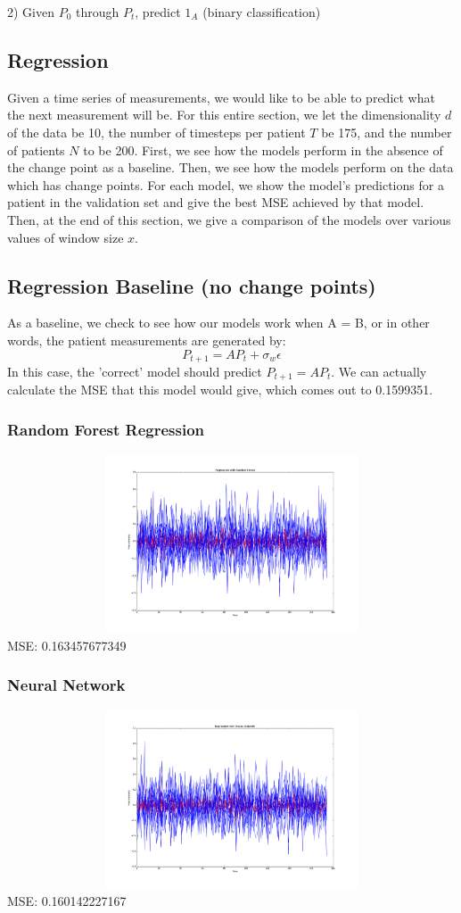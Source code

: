 \documentclass[12pt,a4paper]{article}
\begin{document}
2) Given $P_0$ through $P_t$, predict $1_A$ (binary classification) 

\subsection{Regression}
Given a time series of measurements, we would like to be able to predict what the next measurement will be.  For this entire section, we let the dimensionality $d$ of the data be 10, the number of timesteps per patient $T$ be 175, and the number of patients $N$ to be 200.   First, we see how the models perform in the absence of the change point as a baseline.  Then, we see how the models perform on the data which has change points. For each model, we show the model's predictions for a patient in the validation set and give the best MSE achieved by that model.  Then, at the end of this section, we give a comparison of the models over various values of window size $x$.  

\subsection{Regression Baseline (no change points)}
As a baseline, we check to see how our models work when A = B, or in other words, the patient measurements are generated by: 
$$P_{t+1} = AP_{t} + \sigma_w \epsilon$$
In this case, the 'correct' model should predict $P_{t + 1} = AP_t$.  We can actually calculate the MSE that this model would give, which comes out to 0.1599351.  

\subsubsection{Random Forest Regression}
\includegraphics[height=200px, width=1\textwidth]{tree_regression_projection_a_eq_b}
MSE: 0.163457677349 \\
\subsubsection{Neural Network}
\includegraphics[height=200px, width=1\textwidth]{nn_regression_projection_a_eq_b}
MSE: 0.160142227167 \\
\end{document}
